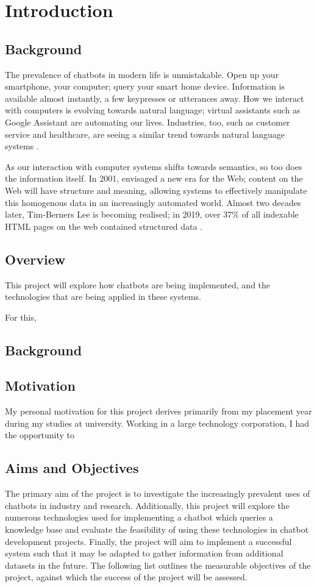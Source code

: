 \chapter{Introduction}
\label{ch:intro}
\section{Background}
The prevalence of chatbots in modern life is unmistakable. Open up your smartphone, your computer; query your smart home device. Information is available almost instantly, a few keypresses or utterances away. How we interact with computers is evolving towards natural language; virtual assistants such as Google Assistant are automating our lives. Industries, too, such as customer service and healthcare, are seeing a similar trend towards natural language systems \cite{gvr2017}.

As our interaction with computer systems shifts towards semantics, so too does the information itself. In 2001, \citet{berners2001semantic} envisaged a new era for the Web; content on the Web will have structure and meaning, allowing systems to effectively manipulate this homogenous data in an increasingly automated world. Almost two decades later, Tim-Berners Lee is becoming realised; in 2019, over 37\% of all indexable HTML pages on the web contained structured data \cite{wdc2019crawl}.


\section{Overview}
This project will explore how chatbots are being implemented, and the technologies that are being applied in these systems.

For this, 

\section{Background}

\section{Motivation}
My personal motivation for this project derives primarily from my placement year during my studies at university. Working in a large technology corporation, I had the opportunity to 

\newpage
\section{Aims and Objectives}
\label{sec:aims}
The primary aim of the project is to investigate the increasingly prevalent uses of chatbots in industry and research. Additionally, this project will explore the numerous technologies used for implementing a chatbot which queries a knowledge base and evaluate the feasibility of using these technologies in chatbot development projects. Finally, the project will aim to implement a successful system such that it may be adapted to gather information from additional datasets in the future. The following list outlines the measurable objectives of the project, against which the success of the project will be assessed.

